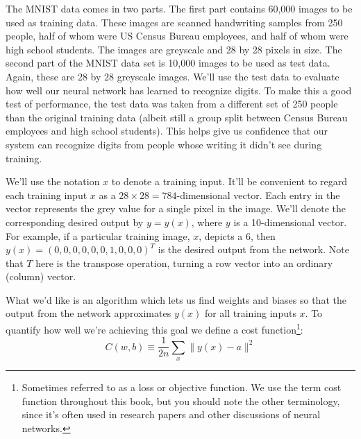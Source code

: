 \documentclass[a4paper,twoside,10pt]{book}
\begin{document}
The MNIST data comes in two parts. The first part contains 60,000 images to be used as training data. These images are scanned handwriting samples from 250 people, half of whom were US Census Bureau employees, and half of whom were high school students. The images are greyscale and 28 by 28 pixels in size. The second part of the MNIST data set is 10,000 images to be used as test data. Again, these are 28 by 28 greyscale images. We'll use the test data to evaluate how well our neural network has learned to recognize digits. To make this a good test of performance, the test data was taken from a different set of 250 people than the original training data (albeit still a group split between Census Bureau employees and high school students). This helps give us confidence that our system can recognize digits from people whose writing it didn't see during training.

We'll use the notation $x$ to denote a training input. It'll be convenient to regard each training input $x$ as a $28\times28=784$-dimensional vector. Each entry in the vector represents the grey value for a single pixel in the image. We'll denote the corresponding desired output by $y=y(x)$, where $y$ is a 10-dimensional vector. For example, if a particular training image, $x$, depicts a 6, then $y(x)=(0,0,0,0,0,0,1,0,0,0)^T$ is the desired output from the network. Note that $T$ here is the transpose operation, turning a row vector into an ordinary (column) vector.

What we'd like is an algorithm which lets us find weights and biases so that the output from the network approximates $y(x)$ for all training inputs $x$. To quantify how well we're achieving this goal we define a cost function\footnote{Sometimes referred to as a loss or objective function. We use the term cost function throughout this book, but you should note the other terminology, since it's often used in research papers and other discussions of neural networks.}:
\begin{equation}
	C(w,b) \equiv\frac1{2n}\sum_x\|y(x)-a\|^2
	\label{eq:6}
\end{equation}
\end{document}
